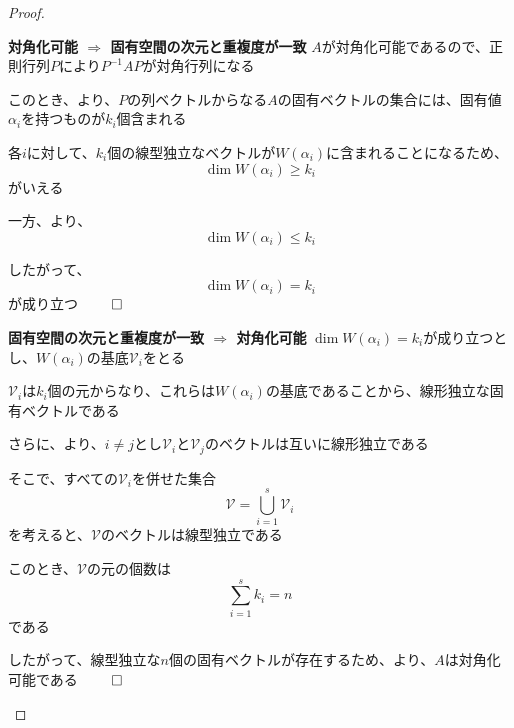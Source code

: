 \documentclass[../../../topic_linear-algebra]{subfiles}
\begin{document}
\begin{proof}
  \begin{subpattern}{\bfseries 対角化可能 $\Longrightarrow$ 固有空間の次元と重複度が一致}
    $A$が対角化可能であるので、正則行列$P$により$P^{-1}AP$が対角行列になる

    このとき、より、$P$の列ベクトルからなる$A$の固有ベクトルの集合には、固有値$\alpha_i$を持つものが$k_i$個含まれる

    \br

    各$i$に対して、$k_i$個の線型独立なベクトルが$W(\alpha_i)$に含まれることになるため、
    \begin{equation*}
      \dim W(\alpha_i) \geq k_i
    \end{equation*}
    がいえる

    \br

    一方、より、
    \begin{equation*}
      \dim W(\alpha_i) \leq k_i
    \end{equation*}

    したがって、
    \begin{equation*}
      \dim W(\alpha_i) = k_i
    \end{equation*}
    が成り立つ $\qed$
  \end{subpattern}

  \begin{subpattern}{\bfseries 固有空間の次元と重複度が一致 $\Longrightarrow$ 対角化可能}
    $\dim W(\alpha_i) = k_i$が成り立つとし、$W(\alpha_i)$の基底$\mathcal{V}_i$をとる

    $\mathcal{V}_i$は$k_i$個の元からなり、これらは$W(\alpha_i)$の基底であることから、線形独立な固有ベクトルである

    \br

    さらに、より、$i\neq j$とし$\mathcal{V}_i$と$\mathcal{V}_j$のベクトルは互いに線形独立である

    そこで、すべての$\mathcal{V}_i$を併せた集合
    \begin{equation*}
      \mathcal{V} = \bigcup_{i=1}^s \mathcal{V}_i
    \end{equation*}
    を考えると、$\mathcal{V}$のベクトルは線型独立である

    \br

    このとき、$\mathcal{V}$の元の個数は
    \begin{equation*}
      \sum_{i=1}^s k_i = n
    \end{equation*}
    である

    \br

    したがって、線型独立な$n$個の固有ベクトルが存在するため、より、$A$は対角化可能である $\qed$
  \end{subpattern}
\end{proof}
\end{document}
